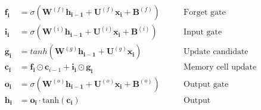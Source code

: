 \documentclass[11pt, letterpaper]{article}
\begin{document}
\begin{align*} 
    \mathbf{f_i} &= \sigma(\mathbf{W}^{(f)} \mathbf{h_{i-1}} + \mathbf{U}^{(f)} \mathbf{x_{i}}    + \mathbf{B}^{(f)} ) \qquad   &\text{Forget gate} \\
    \mathbf{i_i} &= \sigma(\mathbf{W}^{(i)} \mathbf{h_{i-1}} + \mathbf{U}^{(i)} \mathbf{x_{i}}   + \mathbf{B}^{(i)} ) \qquad  &\text{Input gate} \\
    \mathbf{g_i} &= tanh(\mathbf{W}^{(g)} \mathbf{h_{i-1}} + \mathbf{U}^{(g)} \mathbf{x_{i}} )  \qquad   &\text{Update candidate}\\
    \mathbf{c_i} &= \mathbf{f_i} \odot \mathbf{c}_{i-1}  + \mathbf{i_i} \odot \mathbf{g_i}  \qquad   &\text{Memory cell update}\\
    \mathbf{o_i} &= \sigma(\mathbf{W}^{(o)} \mathbf{h_{i-1}} + \mathbf{U}^{(o)} \mathbf{x_{i}}   + \mathbf{B}^{(o)} ) \qquad   &\text{Output gate}\\
    \mathbf{h_i} &= \mathbf{o_i} \cdot \text{tanh}(\mathbf{c_i})  \qquad   &\text{Output} 
\end{align*} 
\end{document}
